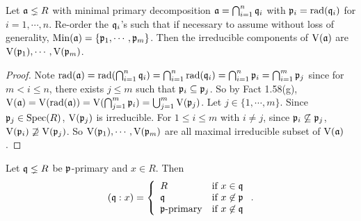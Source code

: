 \begin{proposition}
    Let $\mathfrak{a} \lneq R$ with minimal primary decomposition $\mathfrak{a} = \bigcap_{i=1}^{n} \mathfrak{q}_i$ with $\mathfrak{p}_i = \operatorname{rad}(\mathfrak{q}_i)$ for $i = 1,\cdots,n$. Re-order the $\mathfrak{q}_i$'s such that if necessary to assume without loss of generality, $\operatorname{Min}(\mathfrak{a}) = \{\mathfrak{p}_1,\cdots,\mathfrak{p}_m\}$. Then the irreducible components of $\operatorname{V}(\mathfrak{a})$ are $\operatorname{V}(\mathfrak{p}_1),\cdots,\operatorname{V}(\mathfrak{p}_m)$.
\end{proposition}

\begin{proof}
    Note $\operatorname{rad}(\mathfrak{a}) = \operatorname{rad}(\bigcap_{i=1}^{n}\mathfrak{q}_i) = \bigcap_{i=1}^{n} \operatorname{rad}(\mathfrak{q}_i) = \bigcap_{i=1}^{n} \mathfrak{p}_i = \bigcap_{i=1}^{m} \mathfrak{p}_j$ since for $m < i \leq n$, there exists $j \leq m$ such that $\mathfrak{p}_i \subseteq \mathfrak{p}_j$. So by Fact 1.58(g), $\operatorname{V}(\mathfrak{a}) = \operatorname{V}(\operatorname{rad}(\mathfrak{a})) = \operatorname{V}(\bigcap_{j=1}^{m}\mathfrak{p}_i) = \bigcup_{j=1}^{m} \operatorname{V}(\mathfrak{p}_j)$. Let $j \in \{1,\cdots,m\}$. Since $\mathfrak{p}_j \in \operatorname{Spec}(R)$, $\operatorname{V}(\mathfrak{p}_j)$ is irreducible. For $1 \leq i \leq m$ with $i \neq j$, since $\mathfrak{p}_i \not\subseteq \mathfrak{p}_j$, $\operatorname{V}(\mathfrak{p}_i) \not\supseteq \operatorname{V}(\mathfrak{p}_j)$. So $\operatorname{V}(\mathfrak{p}_1),\cdots,\operatorname{V}(\mathfrak{p}_m)$ are all maximal irreducible subset of $\operatorname{V}(\mathfrak{a})$. 
\end{proof}

\begin{proposition}
    Let $\mathfrak{q} \lneq R$ be $\mathfrak{p}$-primary and $x \in R$. Then 
    \[
        (\mathfrak{q}:x) = \left\{
            \begin{array}{ll}
                R &\text{if }x \in \mathfrak{q} \\
                \mathfrak{q} &\text{if }x \not \in \mathfrak{p} \\
                \mathfrak{p}\text{-primary} &\text{if }x \not \in \mathfrak{q} \\
            \end{array}
        \right..
    \]
\end{proposition}

